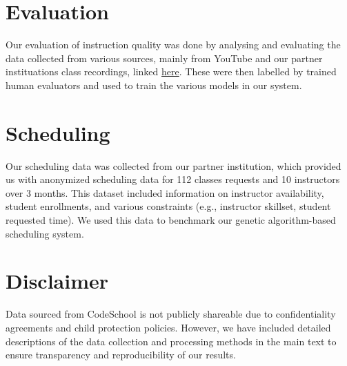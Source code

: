 \section*{Evaluation}
Our evaluation of instruction quality was done by analysing and evaluating the data collected from various sources, mainly from YouTube and our partner instituations class recordings, linked \hyperlink{https://drive.google.com/file/d/1jeGrXsPUNfsRL8g55DkFX7OJQ83z5T-t/view?usp=sharing}{here}. These were then labelled by trained human evaluators and used to train the various models in our system. 

\section*{Scheduling}
Our scheduling data was collected from our partner institution, which provided us with anonymized scheduling data for 112 classes requests and 10 instructors over 3 months. This dataset included information on instructor availability, student enrollments, and various constraints (e.g., instructor skillset, student requested time). We used this data to benchmark our genetic algorithm-based scheduling system.

\section*{Disclaimer}
Data sourced from CodeSchool is not publicly shareable due to confidentiality agreements and child protection policies. However, we have included detailed descriptions of the data collection and processing methods in the main text to ensure transparency and reproducibility of our results.